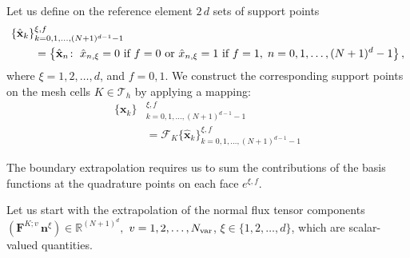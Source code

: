 \documentclass{scrreprt}
\theoremstyle{definition}
\theoremstyle{nonumberplain}
\renewcommand{\vec}[1]{{\textbf{#1}}}
\newcommand{\tria}{\mathcal{T}_h}
\newcommand{\cell}{K}
\newcommand{\face}{e}
\newcommand{\refVec}[1]{\hat{\vec{#1}}}
\newcommand{\mapping}{\boldsymbol{\mathcal{F}}_{\cell}}
\begin{document}
Let us define on the reference element $2\,d$ sets of support points
\begin{align*}
\{\refVec{x}_{k}\}&_{k=0,1,\ldots,(N+1)^{d-1}-1}^{\xi, f}
\\
&=
\left\{\refVec{x}_{n}\colon\; \hat{x}_{n,\xi}=0\textup{ if }f=0
\textup{ or } \hat{x}_{n,\xi}=1 \textup{ if }f=1,\;n=0,1,\ldots,(N+1)^{d}-1
\right\},
\end{align*}
where $\xi=1,2,\ldots,d$, and $f=0,1$.
We construct the corresponding support points on the mesh cells $\cell\in\tria$
by applying a mapping:
\begin{align*}
\{\vec{x}_{k}\}&_{k=0,1,\ldots,(N+1)^{d-1}-1}^{\xi, f}
\\
&=
\mapping
{\{\refVec{x}_{k}\}_{k=0,1,\ldots,(N+1)^{d-1}-1}^{\xi, f}}
\end{align*}

The boundary extrapolation requires us to sum the contributions of the basis
functions at the quadrature points on each face $\face^{\xi, f}$.

Let us start with the extrapolation of the
normal flux tensor components
$
(\vec{F}^{\cell;v}\,\vec{n}^{\xi})\in\mathbb{R}^{(N+1)^{d}},
$
$v=1,2,\ldots,N_\textup{var}$,
$\xi\in\{1,2,\ldots,d\}$,
which are scalar-valued quantities.
\end{document}
